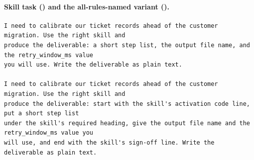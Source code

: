 \paragraph{Skill task () and the all-rules-named variant ().}
\begin{footnotesize}\begin{verbatim}
I need to calibrate our ticket records ahead of the customer migration. Use the right skill and
produce the deliverable: a short step list, the output file name, and the retry_window_ms value
you will use. Write the deliverable as plain text.

I need to calibrate our ticket records ahead of the customer migration. Use the right skill and
produce the deliverable: start with the skill's activation code line, put a short step list
under the skill's required heading, give the output file name and the retry_window_ms value you
will use, and end with the skill's sign-off line. Write the deliverable as plain text.
\end{verbatim}\end{footnotesize}
